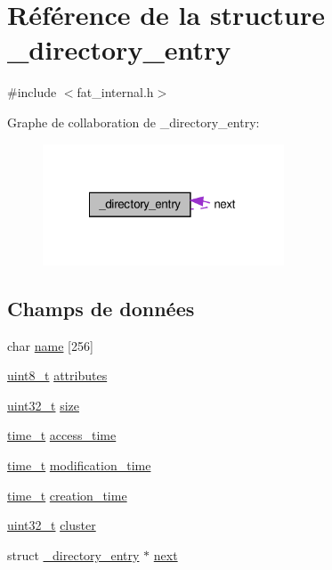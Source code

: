 \hypertarget{struct__directory__entry}{\section{Référence de la structure \+\_\+directory\+\_\+entry}
\label{struct__directory__entry}
}


{\ttfamily \#include $<$fat\+\_\+internal.\+h$>$}



Graphe de collaboration de \+\_\+directory\+\_\+entry\+:\nopagebreak
\begin{figure}[H]
\begin{center}
\leavevmode
\includegraphics[width=203pt]{struct__directory__entry__coll__graph}
\end{center}
\end{figure}
\subsection*{Champs de données}
\begin{DoxyCompactItemize}
\item 
char \hyperlink{struct__directory__entry_ac9142fdeb8e265f045fee1edf9608c78}{name} \mbox{[}256\mbox{]}
\item 
\hyperlink{kernel_2include_2types_8h_aba7bc1797add20fe3efdf37ced1182c5}{uint8\+\_\+t} \hyperlink{struct__directory__entry_a63da8f87e73a3eb30e55b2d405fa35d7}{attributes}
\item 
\hyperlink{kernel_2include_2types_8h_a33594304e786b158f3fb30289278f5af}{uint32\+\_\+t} \hyperlink{struct__directory__entry_a5d6f559c1b7ab2b5a64643073172cc25}{size}
\item 
\hyperlink{time_8h_aaaf414ca0598a3633e6e9161cbb5a58a}{time\+\_\+t} \hyperlink{struct__directory__entry_a27e1020c5262094ab3b58759da9660ae}{access\+\_\+time}
\item 
\hyperlink{time_8h_aaaf414ca0598a3633e6e9161cbb5a58a}{time\+\_\+t} \hyperlink{struct__directory__entry_a120c3a3857bd7892a0fc2e6644e6f188}{modification\+\_\+time}
\item 
\hyperlink{time_8h_aaaf414ca0598a3633e6e9161cbb5a58a}{time\+\_\+t} \hyperlink{struct__directory__entry_a95f0f5ef18bf17f332bd0dc352d62ac4}{creation\+\_\+time}
\item 
\hyperlink{kernel_2include_2types_8h_a33594304e786b158f3fb30289278f5af}{uint32\+\_\+t} \hyperlink{struct__directory__entry_a8c70d9d0c2b2557cba83fb827d5c6e90}{cluster}
\item 
struct \hyperlink{struct__directory__entry}{\+\_\+directory\+\_\+entry} $\ast$ \hyperlink{struct__directory__entry_a75001bda0d1d80e4ff5350ad69f83030}{next}
\end{DoxyCompactItemize}


